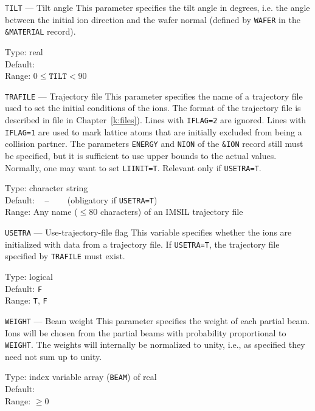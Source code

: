 \begin{keydescription}{\texttt{TILT} --- Tilt angle}
%
  This parameter specifies the tilt angle in degrees, i.e. the angle
  between the initial ion direction and the wafer normal (defined by
  \texttt{WAFER} in the \texttt{\&MATERIAL} record).
%
  \begin{keytab}
    Type:    \> real \\
    Default:  \\
    Range:   \> $0 \le \texttt{TILT} < 90$
  \end{keytab}
\end{keydescription}

\begin{keydescription}{\texttt{TRAFILE} --- Trajectory file}
%
  This parameter specifies the name of a trajectory file used to set the
  initial conditions of the ions. The format of the trajectory file
  is described in file in Chapter~\ref{k:files}). Lines with
  \texttt{IFLAG=2} are ignored. Lines with \texttt{IFLAG=1} are used to
  mark lattice atoms that are initially excluded from being a collision
  partner. The parameters \texttt{ENERGY} and \texttt{NION} of the
  \texttt{\&ION} record still must be specified, but it is sufficient to use
  upper bounds to the actual values. Normally, one may want to set
  \texttt{LIINIT=T}. Relevant only if \texttt{USETRA=T}.
  \begin{keytab}
    Type:    \> character string \\
    Default: \> ~ -- ~~~ (obligatory if \texttt{USETRA=T}) \\
    Range:   \> Any name ($\le 80$ characters) of an IMSIL trajectory file
  \end{keytab}
\end{keydescription}

\begin{keydescription}{\texttt{USETRA} --- Use-trajectory-file flag}
%
  This variable specifies whether the ions are initialized with data from a
  trajectory file. If \texttt{USETRA=T}, the trajectory file specified by
  \texttt{TRAFILE} must exist.
%
  \begin{keytab}
    Type:    \> logical \\
    Default: \> \texttt{F} \\
    Range:   \> \texttt{T}, \texttt{F}
  \end{keytab}
\end{keydescription}

\begin{keydescription}{\texttt{WEIGHT} --- Beam weight}
%
  This parameter specifies the weight of each partial beam. Ions will be chosen
  from the partial beams with probability proportional to \texttt{WEIGHT}. The
  weights will internally be normalized to unity, i.e., as specified they need
  not sum up to unity.
%
  \begin{keytab}
    Type:    \> index variable array (\texttt{BEAM}) of real \\
    Default:  \\
    Range:   \> $\ge 0$
  \end{keytab}
\end{keydescription}

